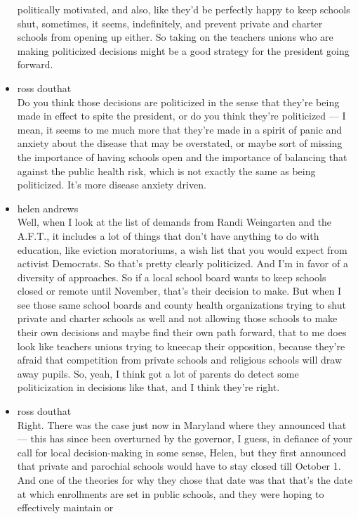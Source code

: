 \begin{itemize}
  politically motivated, and also, like they'd be perfectly happy to
  keep schools shut, sometimes, it seems, indefinitely, and prevent
  private and charter schools from opening up either. So taking on the
  teachers unions who are making politicized decisions might be a good
  strategy for the president going forward.
\item
  ross douthat\\
  Do you think those decisions are politicized in the sense that they're
  being made in effect to spite the president, or do you think they're
  politicized --- I mean, it seems to me much more that they're made in
  a spirit of panic and anxiety about the disease that may be
  overstated, or maybe sort of missing the importance of having schools
  open and the importance of balancing that against the public health
  risk, which is not exactly the same as being politicized. It's more
  disease anxiety driven.
\item
  helen andrews\\
  Well, when I look at the list of demands from Randi Weingarten and the
  A.F.T., it includes a lot of things that don't have anything to do
  with education, like eviction moratoriums, a wish list that you would
  expect from activist Democrats. So that's pretty clearly politicized.
  And I'm in favor of a diversity of approaches. So if a local school
  board wants to keep schools closed or remote until November, that's
  their decision to make. But when I see those same school boards and
  county health organizations trying to shut private and charter schools
  as well and not allowing those schools to make their own decisions and
  maybe find their own path forward, that to me does look like teachers
  unions trying to kneecap their opposition, because they're afraid that
  competition from private schools and religious schools will draw away
  pupils. So, yeah, I think got a lot of parents do detect some
  politicization in decisions like that, and I think they're right.
\item
  ross douthat\\
  Right. There was the case just now in Maryland where they announced
  that--- this has since been overturned by the governor, I guess, in
  defiance of your call for local decision-making in some sense, Helen,
  but they first announced that private and parochial schools would have
  to stay closed till October 1. And one of the theories for why they
  chose that date was that that's the date at which enrollments are set
  in public schools, and they were hoping to effectively maintain or

\end{itemize}
